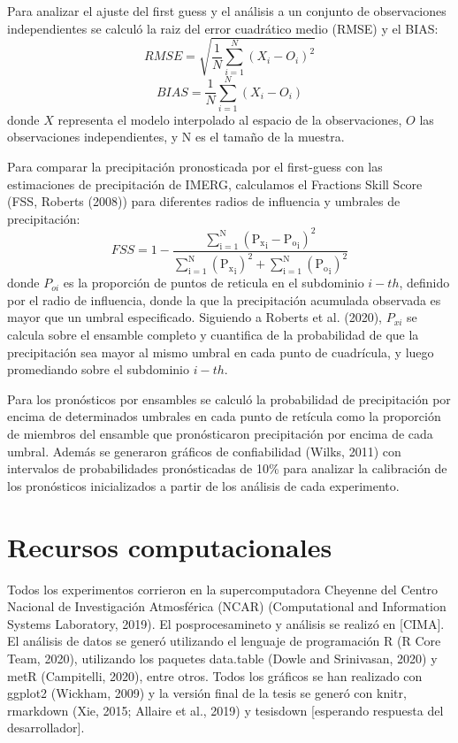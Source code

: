 \documentclass[12pt,oneside]{reedthesis}
\begin{document}
Para analizar el ajuste del first guess y el análisis a un conjunto de observaciones independientes se calculó la raiz del error cuadrático medio (RMSE) y el BIAS:
\begin{equation}
  \mathit{RMSE} = \sqrt{\frac{1}{N}\sum_{i = 1}^{N} (X_i - O_i)^{2}}
  \label{eq:eq9}
\end{equation}
\begin{equation}
  \mathit{BIAS} = \frac{1}{N}\sum_{i = 1}^{N} (X_i - O_i)
  \label{eq:eq10}
\end{equation}
donde \(X\) representa el modelo interpolado al espacio de la observaciones, \(O\) las observaciones independientes, y N es el tamaño de la muestra.

Para comparar la precipitación pronosticada por el first-guess con las estimaciones de precipitación de IMERG, calculamos el Fractions Skill Score (FSS, Roberts (2008)) para diferentes radios de influencia y umbrales de precipitación:
\begin{equation}
  \mathrm{\mathit{FSS} = 1-\frac{\sum_{i=1}^{N} ({P_x}_i-{P_o}_i)^{2}}{\sum_{i=1}^{N} ({P_x}_i)^{2}+\sum_{i=1}^{N} ({P_o}_i)^{2}}}
    \label{eq:eq11}
\end{equation}
donde \(P_{oi}\) es la proporción de puntos de reticula en el subdominio \(i-th\), definido por el radio de influencia, donde la que la precipitación acumulada observada es mayor que un umbral especificado. Siguiendo a Roberts et al. (2020), \(P_{xi}\) se calcula sobre el ensamble completo y cuantifica de la probabilidad de que la precipitación sea mayor al mismo umbral en cada punto de cuadrícula, y luego promediando sobre el subdominio \(i-th\).

Para los pronósticos por ensambles se calculó la probabilidad de precipitación por encima de determinados umbrales en cada punto de retícula como la proporción de miembros del ensamble que pronósticaron precipitación por encima de cada umbral. Además se generaron gráficos de confiabilidad (Wilks, 2011) con intervalos de probabilidades pronósticadas de 10\% para analizar la calibración de los pronósticos inicializados a partir de los análisis de cada experimento.

\hypertarget{recursos-computacionales}{%
\section{Recursos computacionales}\label{recursos-computacionales}}

Todos los experimentos corrieron en la supercomputadora Cheyenne del Centro Nacional de Investigación Atmosférica (NCAR) (Computational and Information Systems Laboratory, 2019). El posprocesamineto y análisis se realizó en {[}CIMA{]}. El análisis de datos se generó utilizando el lenguaje de programación R (R Core Team, 2020), utilizando los paquetes data.table (Dowle and Srinivasan, 2020) y metR (Campitelli, 2020), entre otros.
Todos los gráficos se han realizado con ggplot2 (Wickham, 2009) y la versión final de la tesis se generó con knitr, rmarkdown (Xie, 2015; Allaire et al., 2019) y tesisdown {[}esperando respuesta del desarrollador{]}.
\end{document}
